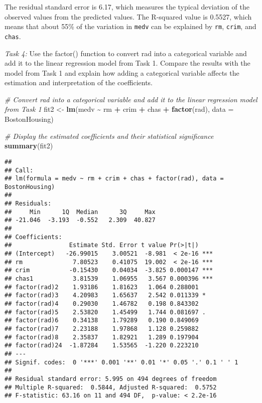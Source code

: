 \documentclass[
]{book}
\newenvironment{Shaded}{\begin{snugshade}}{\end{snugshade}}
\newcommand{\AttributeTok}[1]{\textcolor[rgb]{0.13,0.29,0.53}{#1}}
\newcommand{\CommentTok}[1]{\textcolor[rgb]{0.56,0.35,0.01}{\textit{#1}}}
\newcommand{\FunctionTok}[1]{\textcolor[rgb]{0.13,0.29,0.53}{\textbf{#1}}}
\newcommand{\NormalTok}[1]{#1}
\newcommand{\OtherTok}[1]{\textcolor[rgb]{0.56,0.35,0.01}{#1}}
\newcommand{\SpecialCharTok}[1]{\textcolor[rgb]{0.81,0.36,0.00}{\textbf{#1}}}
\begin{document}
The residual standard error is 6.17, which measures the typical deviation of the observed values from the predicted values. The R-squared value is 0.5527, which means that about 55\% of the variation in \texttt{medv} can be explained by \texttt{rm}, \texttt{crim}, and \texttt{chas}.

\emph{Task 4:} Use the factor() function to convert rad into a categorical variable and add it to the linear regression model from Task 1. Compare the results with the model from Task 1 and explain how adding a categorical variable affects the estimation and interpretation of the coefficients.

\begin{Shaded}
\begin{Highlighting}[]
\CommentTok{\# Convert rad into a categorical variable and add it to the linear regression model from Task 1}
\NormalTok{fit2 }\OtherTok{\textless{}{-}} \FunctionTok{lm}\NormalTok{(medv }\SpecialCharTok{\textasciitilde{}}\NormalTok{ rm }\SpecialCharTok{+}\NormalTok{ crim }\SpecialCharTok{+}\NormalTok{ chas }\SpecialCharTok{+} \FunctionTok{factor}\NormalTok{(rad), }\AttributeTok{data =}\NormalTok{ BostonHousing)}

\CommentTok{\# Display the estimated coefficients and their statistical significance}
\FunctionTok{summary}\NormalTok{(fit2)}
\end{Highlighting}
\end{Shaded}

\begin{verbatim}
## 
## Call:
## lm(formula = medv ~ rm + crim + chas + factor(rad), data = BostonHousing)
## 
## Residuals:
##     Min      1Q  Median      3Q     Max 
## -21.046  -3.193  -0.552   2.309  40.827 
## 
## Coefficients:
##                Estimate Std. Error t value Pr(>|t|)    
## (Intercept)   -26.99015    3.00521  -8.981  < 2e-16 ***
## rm              7.80523    0.41075  19.002  < 2e-16 ***
## crim           -0.15430    0.04034  -3.825 0.000147 ***
## chas1           3.81539    1.06955   3.567 0.000396 ***
## factor(rad)2    1.93186    1.81623   1.064 0.288001    
## factor(rad)3    4.20983    1.65637   2.542 0.011339 *  
## factor(rad)4    0.29030    1.46782   0.198 0.843302    
## factor(rad)5    2.53820    1.45499   1.744 0.081697 .  
## factor(rad)6    0.34138    1.79289   0.190 0.849069    
## factor(rad)7    2.23188    1.97868   1.128 0.259882    
## factor(rad)8    2.35837    1.82921   1.289 0.197904    
## factor(rad)24  -1.87284    1.53565  -1.220 0.223210    
## ---
## Signif. codes:  0 '***' 0.001 '**' 0.01 '*' 0.05 '.' 0.1 ' ' 1
## 
## Residual standard error: 5.995 on 494 degrees of freedom
## Multiple R-squared:  0.5844, Adjusted R-squared:  0.5752 
## F-statistic: 63.16 on 11 and 494 DF,  p-value: < 2.2e-16
\end{verbatim}
\end{document}
